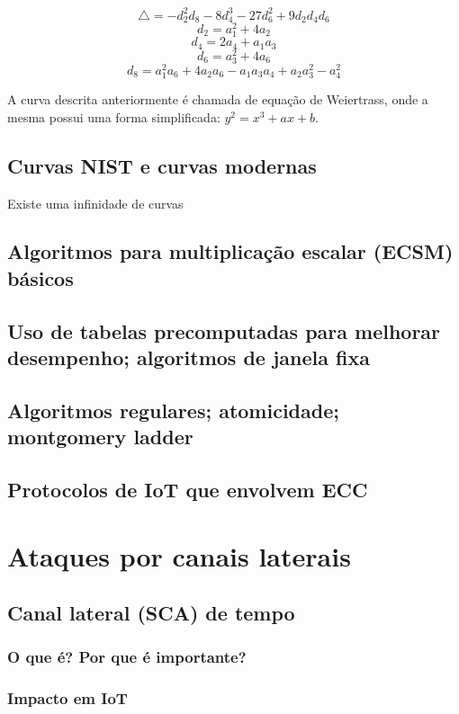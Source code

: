 \documentclass[12pt]{article}
\begin{document}
$$ \bigtriangleup = -d_2^2d_8 - 8d_4^3 - 27d_6^2 + 9d_2d_4d_6 $$
$$d_2 = a_1^2 + 4a_2$$
$$d_4 = 2a_4 + a_1a_3 $$
$$d_6 = a_3^2 + 4a_6 $$
$$d_8 = a_1^2a_6 + 4a_2a_6 - a_1a_3a_4 + a_2a_3^2 - a_4^2$$

A curva descrita anteriormente é chamada de equação de Weiertrass, onde a mesma possui uma forma simplificada: $y^2 = x^3 + ax + b$.

\subsection{Curvas NIST e curvas modernas}
Existe uma infinidade de curvas 


\subsection{Algoritmos para multiplicação escalar (ECSM) básicos}

\subsection{Uso de tabelas precomputadas para melhorar desempenho; algoritmos de janela fixa}

\subsection{Algoritmos regulares; atomicidade; montgomery ladder}

\subsection{Protocolos de IoT que envolvem ECC}

\section{Ataques por canais laterais}

\subsection{Canal lateral (SCA) de tempo}

\subsubsection{O que é? Por que é importante?}

\subsubsection{Impacto em IoT}
\end{document}
